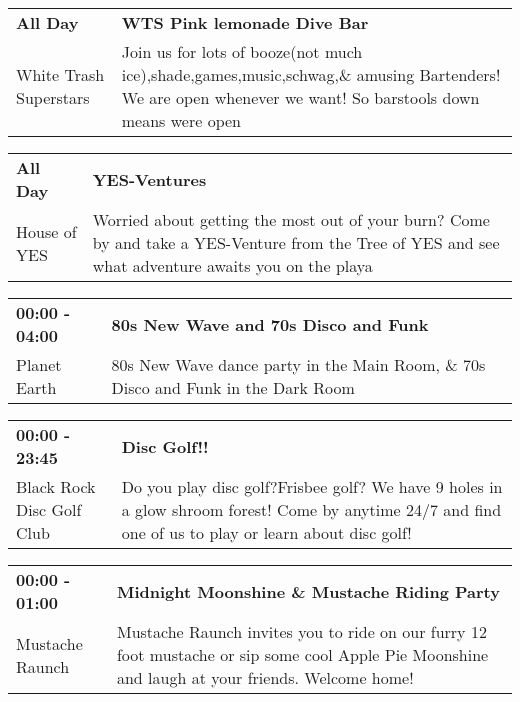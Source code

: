 \begin{tabular}{ p{1in} p{2.2in} }
    \textbf{All Day} & \textbf{WTS Pink lemonade Dive Bar} \\
    White Trash Superstars \newline  & Join us for lots of booze(not much ice),shade,games,music,schwag,\& amusing Bartenders! We are open whenever we want! So barstools down means were open \\
    \hline 
\end{tabular}
    
\begin{tabular}{ p{1in} p{2.2in} }
    \textbf{All Day} & \textbf{YES-Ventures} \\
    House of YES \newline  & Worried about getting the most out of your burn? Come by and take a YES-Venture from the Tree of YES and see what adventure awaits you on the playa \\
    \hline 
\end{tabular}
    
\begin{tabular}{ p{1in} p{2.2in} }
    \textbf{00:00 - 04:00} & \textbf{80s New Wave and 70s Disco and Funk} \\
    Planet Earth \newline  & 80s New Wave dance party in the Main Room, \& 70s Disco and Funk in the Dark Room \\
    \hline 
\end{tabular}
    
\begin{tabular}{ p{1in} p{2.2in} }
    \textbf{00:00 - 23:45} & \textbf{Disc Golf!!} \\
    Black Rock Disc Golf Club \newline  & Do you play disc golf?Frisbee golf? We have 9 holes in a glow shroom forest! Come by anytime 24/7 and find one of us to play or learn about disc golf! \\
    \hline 
\end{tabular}
    
\begin{tabular}{ p{1in} p{2.2in} }
    \textbf{00:00 - 01:00} & \textbf{Midnight Moonshine \& Mustache Riding Party} \\
    Mustache Raunch \newline  & Mustache Raunch invites you to ride on our furry 12 foot mustache or sip some cool Apple Pie Moonshine and laugh at your friends. Welcome home! \\
    \hline 
\end{tabular}
    
